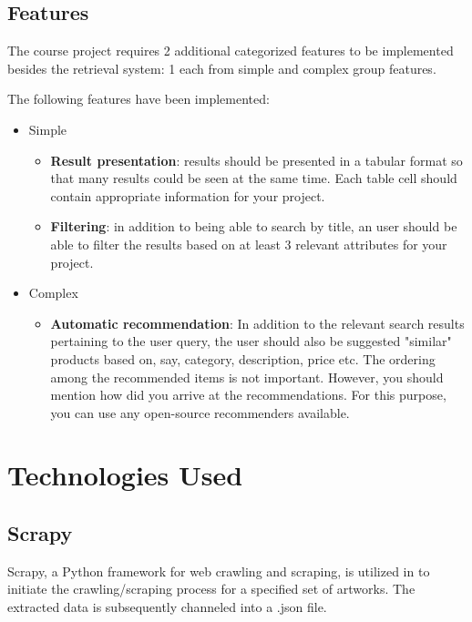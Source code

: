 \documentclass[12pt]{spieman}  %
\begin{document}
\begin{spacing}{1}
    \subsection{Features}
    The course project requires 2 additional categorized features to be implemented besides the retrieval system:
    1 each from simple and complex group features.

    The following features have been implemented:
    \begin{itemize}
        \item Simple
              \begin{itemize}
                  \item \textbf{Result presentation}:
                        results should be presented in a tabular format so that many results could be seen at the same time.
                        Each table cell should contain appropriate information for your project.
                  \item \textbf{Filtering}:
                        in addition to being able to search by title, an user should be able to filter the
                        results based on at least 3 relevant attributes for your project.
              \end{itemize}

        \item Complex
              \begin{itemize}
                  \item \textbf{Automatic recommendation}:
                        In addition to the relevant search results pertaining to the user query,
                        the user should also be suggested "similar" products based on, say, category, description,
                        price etc. The ordering among the recommended items is not important.
                        However, you should mention how did you arrive at the recommendations.
                        For this purpose, you can use any open-source recommenders available.
              \end{itemize}
    \end{itemize}

    \section{Technologies Used}

    \subsection{Scrapy}
    Scrapy, a Python framework for web crawling and scraping, is utilized in to initiate the crawling/scraping process for a specified set of artworks. The extracted data is subsequently channeled into a .json file.


\end{spacing}
\end{document}
